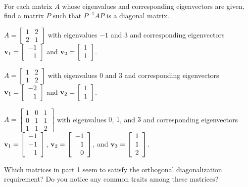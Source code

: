 \begin{pa} \label{pa:7_a} ~ 
 \be
\item For each matrix $A$ whose eigenvalues and corresponding eigenvectors are given, find a matrix $P$ such that $P^{-1}AP$ is a diagonal matrix. 
	\ba
	\item $A = \left[ \begin {array}{cc} 1&2 \\ 2&1 \end {array} \right]$ with eigenvalues $-1$ and 3 and corresponding eigenvectors  $\mathbf{v}_1 = \left[ \begin {array}{r} -1 \\ 1 \end {array} \right]$ and $\mathbf{v}_2 = \left[ \begin {array}{c} 1 \\ 1 \end {array} \right]$. 

	\item $A =  \left[ \begin {array}{cc} 1&2 \\ 1&2 \end {array} \right]$ with eigenvalues $0$ and $3$ and corresponding eigenvectors  $\mathbf{v}_1 = \left[ \begin {array}{r} -2 \\ 1 \end {array} \right]$ and $\mathbf{v}_2 = \left[ \begin {array}{c} 1 \\ 1 \end {array} \right]$. 

	\item $A = \left[ \begin {array}{ccc} 1&0&1 \\ 0&1&1 \\ 1&1&2 \end {array} \right]$ with eigenvalues $0$, $1$, and $3$ and corresponding eigenvectors  $\mathbf{v}_1 = \left[ \begin {array}{r} -1 \\ -1 \\ 1 \end {array} \right]$,  $\mathbf{v}_2 = \left[ \begin {array}{r} -1 \\ 1 \\ 0 \end {array} \right]$, and $\mathbf{v}_3 = \left[ \begin {array}{c} 1 \\ 1 \\ 2 \end {array} \right]$. 

	\ea
	
\item Which matrices in part 1 seem to satisfy the orthogonal diagonalization requirement? Do you notice any common traits among these matrices?  

\ee
\end{pa}


